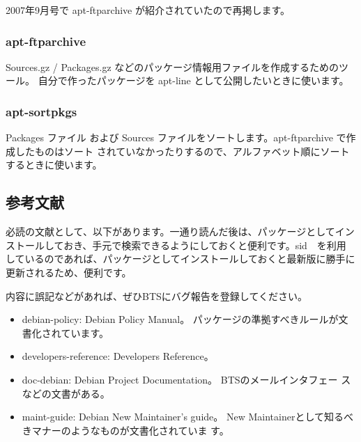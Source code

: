 \documentclass[mingoth,a4paper]{jsarticle}
\begin{document}
2007年9月号で apt-ftparchive が紹介されていたので再掲します。

\subsubsection{apt-ftparchive}
 Sources.gz / Packages.gz などのパッケージ情報用ファイルを作成するためのツール。
 自分で作ったパッケージを apt-line として公開したいときに使います。
\begin{commandline}
\end{commandline}

\subsubsection{apt-sortpkgs}
 Packages ファイル および Sources ファイルをソートします。apt-ftparchive で作成したものはソート
 されていなかったりするので、アルファベット順にソートするときに使います。
\begin{commandline}
\end{commandline} 

 \subsection{参考文献}

 必読の文献として、以下があります。一通り読んだ後は、パッケージとしてイン
 ストールしておき、手元で検索できるようにしておくと便利です。sid　を利用
 しているのであれば、パッケージとしてインストールしておくと最新版に勝手に
 更新されるため、便利です。

 内容に誤記などがあれば、ぜひBTSにバグ報告を登録してください。

 \begin{itemize}
 \item debian-policy: Debian Policy Manual。
       パッケージの準拠すべきルールが文書化されています。
 \item developers-reference: Developers Reference。
       
 \item doc-debian: Debian Project Documentation。 BTSのメールインタフェー
       スなどの文書がある。
 \item maint-guide: Debian New Maintainer's guide。
       New Maintainerとして知るべきマナーのようなものが文書化されていま
       す。
 \end{itemize}
\end{document}
